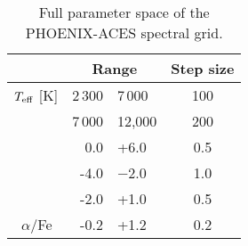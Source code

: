
\begin{table}
    \centering
    \caption{Full parameter space of the {PHOENIX-ACES} spectral grid.}
    \begin{tabular}{lr@{ -- }lc}    %
        \toprule
        & \multicolumn{2}{c}{Range}       & Step size\\
        \midrule
        \( T_{\mathrm{eff}}{}\) [K] &  2\,300 & 7\,000  & 100 \\
        &  7\,000 & 12,000 & 200 \\ 
        \ \logg{}     &  0.0 & +6.0   & 0.5 \\
        \ \feh{}   &  -4.0 & $-$2.0  & 1.0 \\    %
        &  -2.0 & +1.0  & 0.5 \\
        \  \(\alpha\)/Fe &  -0.2 & +1.2  & 0.2 \\
        \bottomrule
    \end{tabular}
    \label{tab:phoenix}
\end{table}

